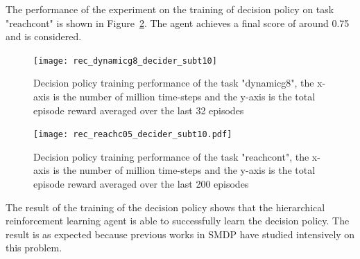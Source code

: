 The performance of the experiment on the training of decision policy on task "reachcont" is shown in Figure~\ref{fig:rec_reachc05_decider_subt10}. The agent achieves a final score of around 0.75 and is considered.


\begin{figure}[!htbp]
\centering
\texttt{[image: rec\_dynamicg8\_decider\_subt10]}
\caption{Decision policy training performance of the task "dynamicg8", the x-axis is the number of million time-steps and the y-axis is the total episode reward averaged over the last 32 episodes}
\label{fig:rec_dynamicg8_decider_subt10}
\end{figure}


\begin{figure}
\centering
\texttt{[image: rec\_reachc05\_decider\_subt10.pdf]}
\caption{Decision policy training performance of the task "reachcont", the x-axis is the number of million time-steps and the y-axis is the total episode reward averaged over the last 200 episodes}
\label{fig:rec_reachc05_decider_subt10}
\end{figure}

The result of the training of the decision policy shows that the hierarchical reinforcement learning agent is able to successfully learn the decision policy. The result is as expected because previous works in SMDP have studied intensively on this problem.



